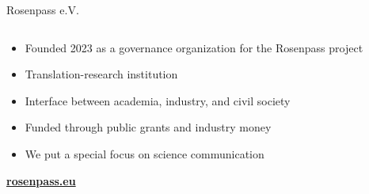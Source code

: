 \begin{frame}{Rosenpass e.V.}
  \begin{columns}[fullwidth,c]
  	\hspace*{.25\LeftSlideIndent}
    \begin{column}{.5\linewidth}
      \begin{itemize}
        \item Founded 2023 as a governance organization for the Rosenpass project
        \item Translation-research institution
        \item Interface between academia, industry, and civil society
        \item Funded through public grants and industry money
        \item We put a special focus on science communication
      \end{itemize}
      \bigskip
      \textbf{\url{rosenpass.eu}}
    \end{column}%
    \begin{column}{.5\linewidth}
    \end{column}%
  \end{columns}
\end{frame}
